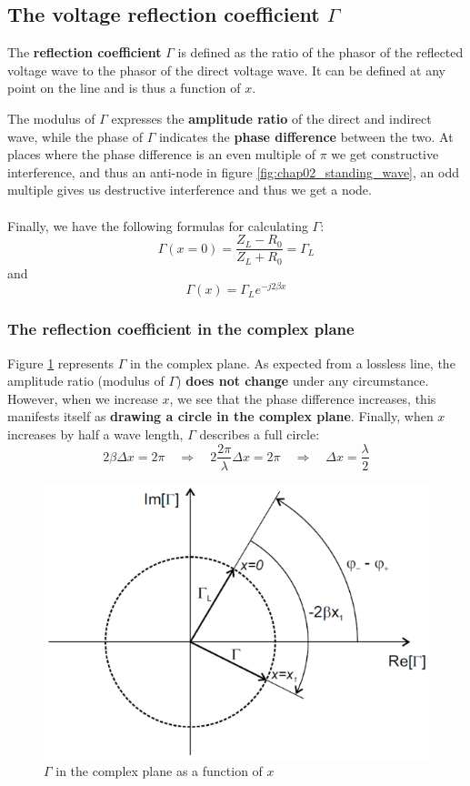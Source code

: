 \documentclass[../transmission.tex]{subfiles}
\begin{document}
		\subsection{The voltage reflection coefficient $\Gamma$}
			The \textbf{reflection coefficient} $\Gamma$ is defined as the ratio of the phasor of the reflected voltage wave to the phasor of the direct voltage wave. It can be defined at any point on the line and is thus a function of $x$.
			
			The modulus of $\Gamma$ expresses the \textbf{amplitude ratio} of the direct and indirect wave, while the phase of $\Gamma$ indicates the \textbf{phase difference} between the two. At places where the phase difference is an even multiple of $\pi$ we get constructive interference, and thus an anti-node in figure \ref{fig:chap02_standing_wave}, an odd multiple gives us destructive interference and thus we get a node. \\
			\\
			Finally, we have the following formulas for calculating $\Gamma$:
			\begin{equation}
				\Gamma(x=0) = \frac{Z_L-R_0}{Z_L+R_0} = \Gamma_L
			\end{equation}
			and
			\begin{equation}
				\Gamma(x)=\Gamma_Le^{-j2\beta x}
			\end{equation}
			
			\subsubsection{The reflection coefficient in the complex plane}
				\label{sec:refl_coeff_complex_plane}
				Figure \ref{fig:chap02_gamma_complex} represents $\Gamma$ in the complex plane. As expected from a lossless line, the amplitude ratio (modulus of $\Gamma$) \textbf{does not change} under any circumstance. However, when we increase $x$, we see that the phase difference increases, this manifests itself as \textbf{drawing a circle in the complex plane}. Finally, when $x$ increases by half a wave length, $\Gamma$ describes a full circle:
				\begin{equation}
					2\beta\Delta x= 2\pi \quad\Rightarrow\quad 2\frac{2\pi}{\lambda}\Delta x = 2\pi \quad\Rightarrow\quad \Delta x = \frac{\lambda}{2}
				\end{equation}
				\begin{figure}[h]
					\centering
					\includegraphics[width=0.5\linewidth]{../assets/chap02_gamma_complex.png}
					\caption{$\Gamma$ in the complex plane as a function of $x$}
					\label{fig:chap02_gamma_complex}
				\end{figure}
				
\end{document}
